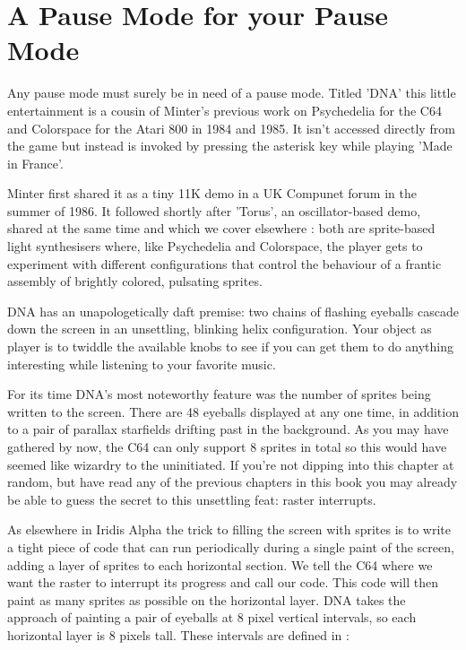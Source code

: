 \chapter{A Pause Mode for your Pause Mode} 
\lstset{style=6502Style}

Any pause mode must surely be in need of a pause mode. Titled 'DNA' this little entertainment is
a cousin of Minter's previous work on Psychedelia for the C64 and Colorspace for the Atari 800
in 1984 and 1985. It isn't accessed directly from the game but instead is invoked by pressing the
asterisk key while playing 'Made in France'.

Minter first shared it as a tiny 11K demo in a UK Compunet forum in the summer of 
1986. It followed shortly after 'Torus', an oscillator-based demo, shared at the same time and which we
cover elsewhere : both are sprite-based
light synthesisers where, like Psychedelia and Colorspace, the player gets to experiment with different
configurations that control the behaviour of a frantic assembly of brightly colored, pulsating sprites.

DNA has an unapologetically daft premise: two chains of flashing eyeballs cascade down the
screen in an unsettling, blinking helix configuration. Your object as player is to twiddle the available
knobs to see if you can get them to do anything interesting while listening to your favorite music.

For its time DNA's most noteworthy feature was the number of sprites being written to the screen. There are
48 eyeballs displayed at any one time, in addition to a pair of parallax starfields drifting past in the
background. As you may have gathered by now, the C64 can only support 8 sprites in total so this would
have seemed like wizardry to the uninitiated. If you're not dipping into this chapter at random, but have
read any of the previous chapters in this book you may already be able to guess the secret to this 
unsettling feat: raster interrupts.

As elsewhere in Iridis Alpha the trick to filling the screen with sprites is to write a tight piece of code
that can run periodically during a single paint of the screen, adding a layer of sprites to each horizontal
section. We tell the C64 where we want the raster to interrupt its progress and call our code. This code
will then paint as many sprites as possible on the horizontal layer. DNA takes the approach of painting a
pair of eyeballs at 8 pixel vertical intervals, so each horizontal layer is 8 pixels tall. 
These intervals are defined in :


